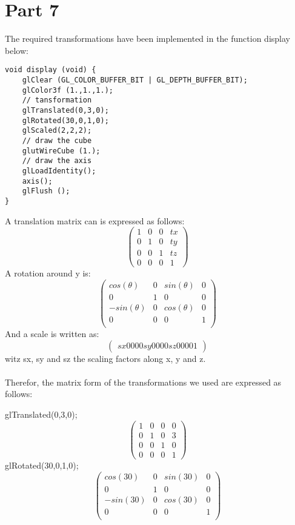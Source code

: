 \section{Part 7}
The required transformations have been implemented in the function display below:
\begin{lstlisting}[caption=Snapshot from Part7.cpp]
void display (void) {
    glClear (GL_COLOR_BUFFER_BIT | GL_DEPTH_BUFFER_BIT);
    glColor3f (1.,1.,1.);
    // tansformation
    glTranslated(0,3,0);
    glRotated(30,0,1,0);
    glScaled(2,2,2);
    // draw the cube
    glutWireCube (1.);
    // draw the axis 
    glLoadIdentity();
    axis();
    glFlush ();
}
\end{lstlisting}

A translation matrix can is expressed as follows:
$$
\begin{pmatrix}
	1&	0& 	0&	tx\\
	0&	1&	0&	ty\\
	0&	0&	1&	tz\\
	0&	0&	0&	1
\end{pmatrix}
$$
A rotation around y is:
$$
\begin{pmatrix}
	cos(\theta)&	0& 	sin(\theta)&	0\\
	0&	        1&	0&	        0\\
	-sin(\theta)&	0&	cos(\theta)&	0\\
	0&	        0&	0&	        1\\
\end{pmatrix}
$$
And a scale is written as:
$$
\begin{pmatrix}
	sx	0 	0	0
	0	sy	0	0
	0	0	sz	0
	0	0	0	1
\end{pmatrix}
$$
witz sx, sy and sz the scaling factors along x, y and z.\\
~\\
Therefor, the matrix form of the transformations we used are expressed as follows:

glTranslated(0,3,0);
$$
\begin{pmatrix}
	1&	0& 	0&	0\\
	0&	1&	0&	3\\
	0&	0&	1&	0\\
	0&	0&	0&	1
\end{pmatrix}$$
glRotated(30,0,1,0);
$$\begin{pmatrix}
	cos(30)&	0& 	sin(30)&	0\\
	0&	        1&	0&	        0\\
	-sin(30)&	0&	cos(30)&	0\\
	0&	        0&	0&	        1\\
\end{pmatrix}$$


